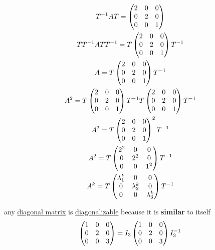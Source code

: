 \documentclass[a4paper,12pt]{article}
\begin{document}
\begin{definition}
\begin{characteristic}
\begin{my_example}
\begin{gather*}
  T^{-1}AT = \pmqty{2 & 0 & 0\\ 0 & 2 & 0\\ 0 & 0 & 1}\\
  TT^{-1}ATT^{-1} = T\pmqty{2 & 0 & 0\\ 0 & 2 & 0\\ 0 & 0 & 1}T^{-1}\\
  A = T\pmqty{2 & 0 & 0\\ 0 & 2 & 0\\ 0 & 0 & 1}T^{-1}\\
  A^2 = T\pmqty{2 & 0 & 0\\ 0 & 2 & 0\\ 0 & 0 & 1}T^{-1}T\pmqty{2 & 0 & 0\\ 0 & 2 & 0\\ 0 & 0 & 1}T^{-1}\\
  A^2 = T\pmqty{2 & 0 & 0\\ 0 & 2 & 0\\ 0 & 0 & 1}^2T^{-1}\\
  A^2 = T\pmqty{2^2 & 0 & 0\\ 0 & 2^2 & 0\\ 0 & 0 & 1^2}T^{-1}\\
  A^k = T\pmqty{\lambda_1^k & 0 & 0\\ 0 & \lambda_2^k & 0\\ 0 & 0 & \lambda_3^k}T^{-1}\\
\end{gather*}
\end{my_example}
\end{characteristic}

\begin{my_example}
any \hyperref[sec:orgaf43c3e]{diagonal matrix} is \hyperref[sec:org136aa39]{diagonalizable} because it is \textbf{similar} to itself\\
\[
  \pmqty{1 & 0 & 0\\ 0 & 2 & 0\\ 0 & 0 & 3} = I_3\pmqty{1 & 0 & 0\\ 0 & 2 & 0\\ 0 & 0 & 3}I_3^{-1}
\]\\
\end{my_example}
\end{definition}
\end{document}
